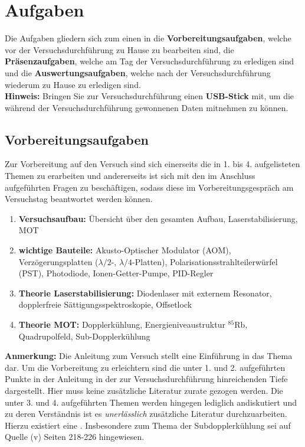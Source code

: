 \documentclass[
class=book,
accentcolor=1b,
custommargins=geometry,
fontsize=11pt,
thesis={type=Versuchsanleitung},
ruledheaders=all,
headline=false,
instbox=false,
marginpar=false,
title=small,
ignore-missing-data=true,
twoside=false,
pdfa=false %
]{apqpub}
\begin{document}
\newpage

\section{Aufgaben}

Die Aufgaben gliedern sich zum einen in die \textbf{Vorbereitungsaufgaben}, welche vor der Versuchsdurchführung zu Hause zu bearbeiten sind, die \textbf{Präsenzaufgaben}, welche am Tag der Versuchsdurchführung zu erledigen sind und die \textbf{Auswertungsaufgaben}, welche nach der Versuchsdurchführung wiederum zu Hause zu erledigen sind.\\

\textbf{Hinweis:} Bringen Sie zur Versuchsdurchführung einen  \textbf{USB-Stick} mit, um die während der Versuchsdurchführung gewonnenen Daten mitnehmen zu können.

\subsection{Vorbereitungsaufgaben}

Zur Vorbereitung auf den Versuch sind sich einerseits die in 1. bis 4. aufgelisteten Themen zu erarbeiten und andererseits ist sich mit den im Anschluss aufgeführten Fragen zu beschäftigen, sodass diese im Vorbereitungsgespräch am Versuchstag beantwortet werden können. 

\begin{enumerate}
	\item \textbf{Versuchsaufbau:} Übersicht über den gesamten Aufbau, Laserstabilisierung, MOT
	
	\item \textbf{wichtige Bauteile:} Akusto-Optischer Modulator (AOM), Verzögerungsplatten ($\lambda/2$-, $\lambda/4$-Platten), Polarisationsstrahlteilerwürfel (PST), Photodiode, Ionen-Getter-Pumpe, PID-Regler
	
	\item \textbf{Theorie Laserstabilisierung:} Diodenlaser mit externem Resonator, dopplerfreie Sättigungsspektroskopie, Offsetlock
	
	\item \textbf{Theorie MOT:} Dopplerkühlung, Energieniveaustruktur $^{85}$Rb, Quadrupolfeld, Sub-Dopplerkühlung   
\end{enumerate}

\textbf{Anmerkung:} Die Anleitung zum Versuch stellt eine Einführung in das Thema dar. Um die Vorbereitung zu erleichtern sind die unter 1. und 2. aufgeführten Punkte in der Anleitung in der zur Versuchsdurchführung hinreichenden Tiefe dargestellt. Hier muss keine zusätzliche Literatur zurate gezogen werden. Die unter 3. und 4. aufgeführten Themen werden hingegen lediglich andiskutiert und zu deren Verständnis ist es \textit{unerlässlich} zusätzliche Literatur durchzuarbeiten. Hierzu existiert eine . Insbesondere zum Thema der Subdopplerkühlung sei auf Quelle (v) Seiten 218-226 hingewiesen.\\
\end{document}
